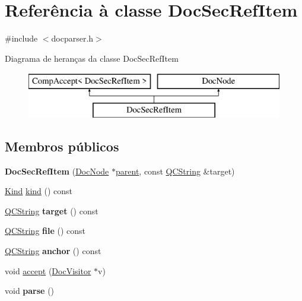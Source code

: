 \hypertarget{class_doc_sec_ref_item}{\section{Referência à classe Doc\-Sec\-Ref\-Item}
\label{class_doc_sec_ref_item}
}


{\ttfamily \#include $<$docparser.\-h$>$}

Diagrama de heranças da classe Doc\-Sec\-Ref\-Item\begin{figure}[H]
\begin{center}
\leavevmode
\includegraphics[height=2.000000cm]{class_doc_sec_ref_item}
\end{center}
\end{figure}
\subsection*{Membros públicos}
\begin{DoxyCompactItemize}
\item 
\hypertarget{class_doc_sec_ref_item_a1b31ddded260cb4784a9b5102c4e5711}{{\bfseries Doc\-Sec\-Ref\-Item} (\hyperlink{class_doc_node}{Doc\-Node} $\ast$\hyperlink{class_doc_node_abd7f070d6b0a38b4da71c2806578d19d}{parent}, const \hyperlink{class_q_c_string}{Q\-C\-String} \&target)}\label{class_doc_sec_ref_item_a1b31ddded260cb4784a9b5102c4e5711}

\item 
\hyperlink{class_doc_node_aa10c9e8951b8ccf714a59ec321bdac5b}{Kind} \hyperlink{class_doc_sec_ref_item_aa9d037bed9f9a083d0cd01485637d843}{kind} () const 
\item 
\hypertarget{class_doc_sec_ref_item_ac714b703f05b9edb9713eae27348d34c}{\hyperlink{class_q_c_string}{Q\-C\-String} {\bfseries target} () const }\label{class_doc_sec_ref_item_ac714b703f05b9edb9713eae27348d34c}

\item 
\hypertarget{class_doc_sec_ref_item_aeaa8cdb0fbabc1058b7d3813f2fd223b}{\hyperlink{class_q_c_string}{Q\-C\-String} {\bfseries file} () const }\label{class_doc_sec_ref_item_aeaa8cdb0fbabc1058b7d3813f2fd223b}

\item 
\hypertarget{class_doc_sec_ref_item_acd17ae1d9600f864b1beb85dfb99a4f4}{\hyperlink{class_q_c_string}{Q\-C\-String} {\bfseries anchor} () const }\label{class_doc_sec_ref_item_acd17ae1d9600f864b1beb85dfb99a4f4}

\item 
void \hyperlink{class_doc_sec_ref_item_a7ba716e854ae2f8f87a4eb2140e302b6}{accept} (\hyperlink{class_doc_visitor}{Doc\-Visitor} $\ast$v)
\item 
\hypertarget{class_doc_sec_ref_item_ad7c704b34912678d95c13243cacf9d7f}{void {\bfseries parse} ()}\label{class_doc_sec_ref_item_ad7c704b34912678d95c13243cacf9d7f}

\end{DoxyCompactItemize}
